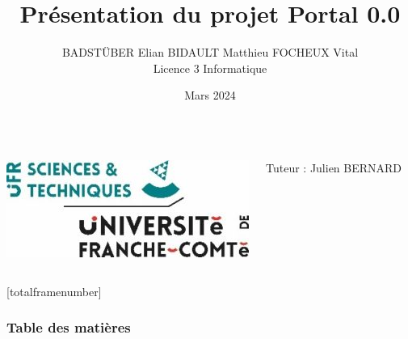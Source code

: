 \documentclass{beamer}
\begin{document}

\title{Présentation du projet Portal 0.0}
\author[BADSTÜBER E. BIDAULT M. FOCHEUX V.]{BADSTÜBER Elian BIDAULT Matthieu FOCHEUX Vital \\
                                                Licence 3 Informatique}
\date{Mars 2024}

\setcounter{framenumber}{0}

{
\begin{frame}
    \titlepage
    
    \vfill %
    \begin{columns}
        \centering
        \includegraphics[width=\textwidth]{images/logo-UFR-ST.jpg} 
    
        \begin{flushright}
            \small Tuteur : Julien BERNARD
        \end{flushright}    
    \end{columns}
\end{frame}
}

\setcounter{framenumber}{0}
[totalframenumber]

\begin{frame}
    \frametitle{Table des matières}
    \tableofcontents
\end{frame}
\end{document}

